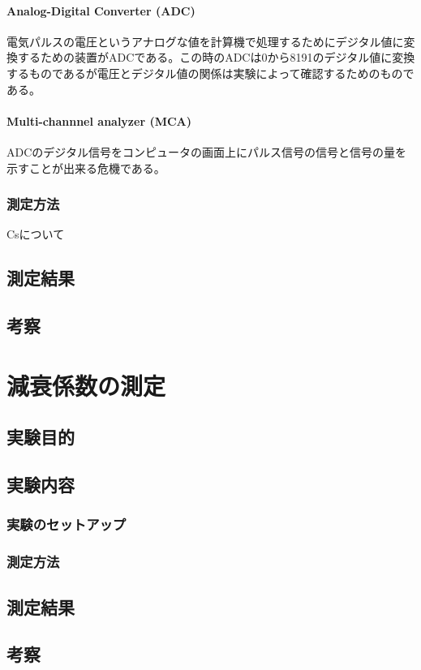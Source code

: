 \documentclass[titlepage]{ltjsarticle}
\begin{document}
\paragraph{Analog-Digital Converter (ADC)}
電気パルスの電圧というアナログな値を計算機で処理するためにデジタル値に変換するための装置がADCである。この時のADCは0から8191のデジタル値に変換するものであるが電圧とデジタル値の関係は実験によって確認するためのものである。

\paragraph{Multi-channnel analyzer (MCA)}
ADCのデジタル信号をコンピュータの画面上にパルス信号の信号と信号の量を示すことが出来る危機である。


\subsubsection{測定方法}
Csについて



\subsection{測定結果}


\subsection{考察}





\section{減衰係数の測定}

\subsection{実験目的}

\subsection{実験内容}
\subsubsection{実験のセットアップ}

\subsubsection{測定方法}



\subsection{測定結果}


\subsection{考察}
\end{document}
